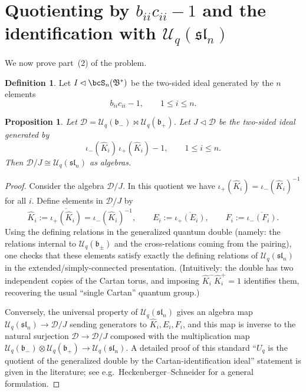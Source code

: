 \documentclass[11pt]{article}
\newtheorem{proposition}{Proposition}
\theoremstyle{definition}
\newtheorem{definition}{Definition}
\newcommand{\Uc}{\mathcal{U}}
\newcommand{\fsl}{\mathfrak{sl}}
\newcommand{\fb}{\mathfrak{b}}
\newcommand{\bipr}{\bowtie}
\newcommand{\tensor}{\otimes}
\newcommand{\Khat}{\widehat{K}}
\newcommand{\E}{E}
\newcommand{\F}{F}
\begin{document}

\section{Quotienting by $b_{ii}c_{ii}-1$ and the identification with $\Uc_q(\fsl_n)$}

We now prove part~(2) of the problem.

\begin{definition}
Let $I\lhd \bcS_n(\mathfrak B^*)$ be the two-sided ideal generated by the $n$ elements
\[
b_{ii}c_{ii}-1,\qquad 1\le i\le n.
\]
\end{definition}

\begin{proposition}\label{prop:double-quotient}
Let $\mathcal{D}=\Uc_q(\fb_-)\bipr \Uc_q(\fb_+)$.
Let $J\lhd \mathcal{D}$ be the two-sided ideal generated by
\[
\iota_-(\Khat_i)\,\iota_+(\Khat_i)-1,\qquad 1\le i\le n.
\]
Then $\mathcal{D}/J \cong \Uc_q(\fsl_n)$ as algebras.
\end{proposition}

\begin{proof}
Consider the algebra $\mathcal{D}/J$. In this quotient we have $\iota_+(\Khat_i)=\iota_-(\Khat_i)^{-1}$ for all $i$.
Define elements in $\mathcal{D}/J$ by
\[
\Khat_i:=\overline{\iota_+(\Khat_i)}=\overline{\iota_-(\Khat_i)^{-1}},
\qquad
\E_i:=\overline{\iota_+(\E_i)},
\qquad
\F_i:=\overline{\iota_-(\F_i)}.
\]
Using the defining relations in the generalized quantum double (namely: the relations internal to $\Uc_q(\fb_\pm)$ and the cross-relations coming from the pairing), one checks that these elements satisfy exactly the defining relations of $\Uc_q(\fsl_n)$ in the extended/simply-connected presentation. (Intuitively: the double has two independent copies of the Cartan torus, and imposing $\Khat_i^-\Khat_i^+=1$ identifies them, recovering the usual ``single Cartan'' quantum group.)

Conversely, the universal property of $\Uc_q(\fsl_n)$ gives an algebra map $\Uc_q(\fsl_n)\to \mathcal{D}/J$ sending generators to $\Khat_i,\E_i,\F_i$, and this map is inverse to the natural surjection $\mathcal{D}\to \mathcal{D}/J$ composed with the multiplication map $\Uc_q(\fb_-)\tensor \Uc_q(\fb_+)\to \Uc_q(\fsl_n)$. A detailed proof of this standard ``$U_q$ is the quotient of the generalized double by the Cartan-identification ideal'' statement is given in the literature; see e.g.\ Heckenberger--Schneider for a general formulation.  %
\end{proof}
\end{document}
